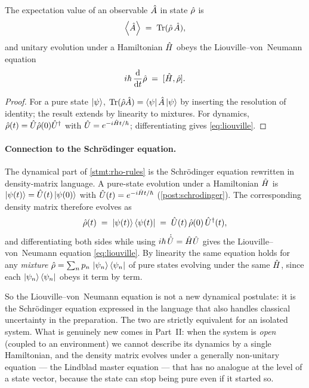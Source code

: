 \begin{statement}
\label{stmt:rho-rules}
The expectation value of an observable $\hat{A}$ in state $\hat{\rho}$
is
\begin{equation}
\expval{\hat{A}} \;=\; \operatorname{Tr}(\hat{\rho}\,\hat{A}),
\end{equation}
and unitary evolution under a Hamiltonian $\hat{H}$ obeys the
Liouville--von~Neumann equation
\begin{equation}
\label{eq:liouville}
i\hbar\,\dv{t}\hat{\rho} \;=\; [\hat{H},\hat{\rho}].
\end{equation}
\end{statement}

\begin{proof}
For a pure state $\ket{\psi}$, $\operatorname{Tr}(\hat{\rho}\hat{A})=\bra{\psi}\hat{A}\ket{\psi}$
by inserting the resolution of identity; the result extends by
linearity to mixtures. For dynamics,
$\hat{\rho}(t)=\hat{U}\hat{\rho}(0)\hat{U}^\dagger$ with
$\hat{U}=e^{-i\hat{H}t/\hbar}$; differentiating gives
\cref{eq:liouville}.
\end{proof}

\paragraph{Connection to the Schr\"odinger equation.}
The dynamical part of \cref{stmt:rho-rules} is the Schr\"odinger
equation rewritten in density-matrix language. A pure-state
evolution under a Hamiltonian $\hat{H}$ is
$\ket{\psi(t)}=\hat{U}(t)\ket{\psi(0)}$ with
$\hat{U}(t)=e^{-i\hat{H}t/\hbar}$ (\cref{post:schrodinger}). The
corresponding density matrix therefore evolves as
\begin{equation}
\hat{\rho}(t) \;=\; \ket{\psi(t)}\bra{\psi(t)}
              \;=\; \hat{U}(t)\,\hat{\rho}(0)\,\hat{U}^\dagger(t),
\end{equation}
and differentiating both sides while using
$i\hbar\,\dot{\hat{U}}=\hat{H}\hat{U}$ gives the Liouville--von~Neumann
equation \cref{eq:liouville}. By linearity the same equation holds
for any \emph{mixture} $\hat{\rho}=\sum_n p_n\,\ket{\psi_n}\bra{\psi_n}$
of pure states evolving under the same $\hat{H}$, since each
$\ket{\psi_n}\bra{\psi_n}$ obeys it term by term.

So the Liouville--von~Neumann equation is not a new dynamical
postulate: it is the Schr\"odinger equation expressed in the
language that also handles classical uncertainty in the
preparation. The two are strictly equivalent for an isolated
system. What is genuinely new comes in Part~II: when the system is
\emph{open} (coupled to an environment) we cannot describe its
dynamics by a single Hamiltonian, and the density matrix evolves
under a generally non-unitary equation --- the Lindblad master
equation --- that has no analogue at the level of a state vector,
because the state can stop being pure even if it started so.

